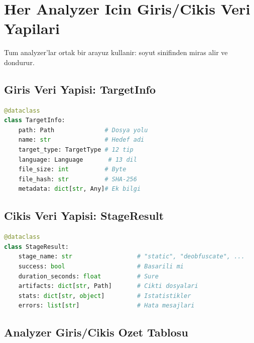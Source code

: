 \section{Her Analyzer Icin Giris/Cikis Veri Yapilari}
\label{sec:analyzer-io}

Tum analyzer'lar ortak bir arayuz kullanir:  soyut sinifinden miras alir ve  dondurur.

\subsection{Giris Veri Yapisi: TargetInfo}

\begin{lstlisting}[language=Python, caption={TargetInfo veri yapisi}]
@dataclass
class TargetInfo:
    path: Path              # Dosya yolu
    name: str               # Hedef adi
    target_type: TargetType # 12 tip
    language: Language       # 13 dil
    file_size: int          # Byte
    file_hash: str          # SHA-256
    metadata: dict[str, Any]# Ek bilgi
\end{lstlisting}

\subsection{Cikis Veri Yapisi: StageResult}

\begin{lstlisting}[language=Python, caption={StageResult veri yapisi}]
@dataclass
class StageResult:
    stage_name: str                  # "static", "deobfuscate", ...
    success: bool                    # Basarili mi
    duration_seconds: float          # Sure
    artifacts: dict[str, Path]       # Cikti dosyalari
    stats: dict[str, object]         # Istatistikler
    errors: list[str]                # Hata mesajlari
\end{lstlisting}

\subsection{Analyzer Giris/Cikis Ozet Tablosu}


